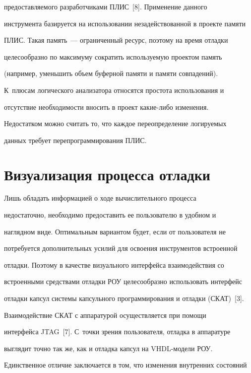 предоставляемого разработчиками ПЛИС~[8]. Применение данного 


инструмента базируется на использовании незадействованной в проекте памяти 


ПЛИС. Такая память~--- ограниченный ресурс, поэтому на время отладки 


целесообразно по максимуму сократить используемую проектом память 


(например, уменьшить объем буферной памяти и памяти совпадений). 


К~плюсам логического анализатора относятся простота использования и 


отсутствие необходимости вносить в проект ка\-кие-ли\-бо изменения. 


Недостатком можно считать то, что каждое переопределение логируемых 


данных требует перепрограммирования ПЛИС.





\section{Визуализация процесса отладки}


      


      Лишь обладать информацией о ходе вычислительного процесса 


недостаточно, необходимо предоставить ее пользователю в удобном и 


наглядном виде. Оптимальным вариантом будет, если от пользователя не 


потребуется дополнительных усилий для освоения инструментов встроенной 


отладки. Поэтому в качестве визуального интерфейса взаимодействия со 


встроенными средствами отладки РОУ целесообразно использовать интерфейс 


отладки капсул системы капсульного программирования и отладки (СКАТ)~[3].


      


      Взаимодействие СКАТ с аппаратурой осуществляется при помощи 


интерфейса JTAG~[7]. С~точки зрения пользователя, отладка в аппаратуре 


выглядит точно так же, как и отладка капсул на VHDL-мо\-де\-ли РОУ. 


Единственное отличие заключается в том, что изменения внутренних состояний 



